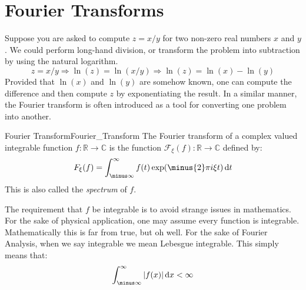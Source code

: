 \section{Fourier Transforms}
    Suppose you are asked to compute $z=x/y$ for
    two non-zero real numbers $x$ and $y$. We could perform
    long-hand division, or transform the problem into
    subtraction by using the natural logarithm.
    \begin{equation}
        z=x/y\Rightarrow
        \ln(z)=\ln(x/y)\Rightarrow
        \ln(z)=\ln(x)-\ln(y)
    \end{equation}
    Provided that $\ln(x)$ and $\ln(y)$ are somehow known,
    one can compute the difference and then compute $z$
    by exponentiating the result. In a similar manner, the
    Fourier transform is often introduced as a tool for
    converting one problem into another.
    \begin{ldefinition}{Fourier Transform}{Fourier_Transform}
        The Fourier transform of a complex valued integrable function
        $f:\mathbb{R}\rightarrow\mathbb{C}$ is the function
        $\mathcal{F}_{\xi}(f):\mathbb{R}\rightarrow\mathbb{C}$ defined by:
        \begin{equation}
            F_{\xi}(f)=\int_{\minus\infty}^{\infty}f(t)
                \exp(\minus{2}\pi{i}\xi{t})\diff{t}
        \end{equation}
        This is also called the \textit{spectrum} of $f$.
    \end{ldefinition}
    The requirement that $f$ be integrable is to avoid
    strange issues in mathematics. For the sake of
    physical application, one may assume every function
    is integrable. Mathematically this is far from true,
    but oh well. For the sake of Fourier Analysis, when
    we say integrable we mean Lebesgue integrable. This
    simply means that:
    \begin{equation}
        \int_{\minus\infty}^{\infty}|f(x)|\diff{x}<\infty
    \end{equation}
